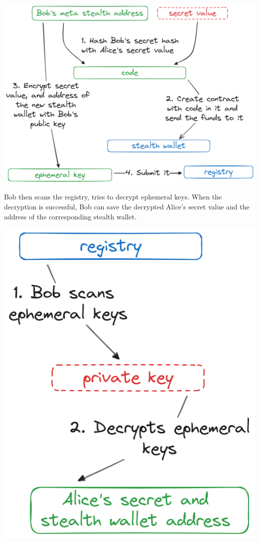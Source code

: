 \documentclass[portrait]{poster}
\begin{document}
\begin{multicols}{2}
    \begin{center}\vspace{1cm}
        \centering
        \includegraphics[width=0.7\linewidth]{../iitsrc/assets/images/sending-funds.png}
        \label{fig:sending-funds}
    \end{center}\vspace{1cm}

    Bob then scans the registry, tries to decrypt ephemeral keys. When the
    decryption is successful, Bob can save the decrypted Alice's secret value
    and the address of the corresponding stealth wallet.

    \begin{center}\vspace{1cm}
        \centering
        \includegraphics[width=0.5\linewidth]{../iitsrc/assets/images/scanning-ephemeral-keys.png}
        \label{fig:scanning-ephemeral-keys}
    \end{center}\vspace{1cm}



\end{multicols}
\end{document}
